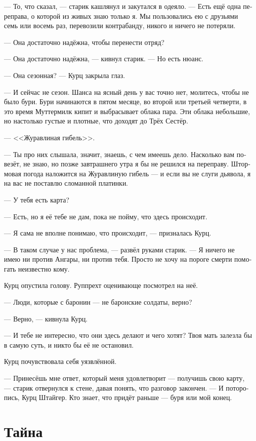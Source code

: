 \documentclass[a4paper,12pt,fleqn]{book}\usepackage{polyglossia}\setdefaultlanguage[babelshorthands=true]{russian}\setotherlanguage{english}\defaultfontfeatures{Ligatures=TeX,Mapping=tex-text}\usepackage{xcolor}\newcommand{\ml}[3]{#2}
\begin{document}
--- То, что сказал, --- старик кашлянул и закутался в одеяло.
--- Есть ещё одна переправа, о которой из живых знаю только я.
Мы пользовались ею с друзьями семь или восемь раз, перевозили контрабанду, никого и ничего не потеряли.

--- Она достаточно надёжна, чтобы перенести отряд?

--- Она достаточно надёжна, --- кивнул старик.
--- Но есть нюанс.

--- Она сезонная? --- Курц закрыла глаз.

--- И сейчас не сезон.
Шанса на ясный день у вас точно нет, молитесь, чтобы не было бури.
Бури начинаются в пятом месяце, во второй или третьей четверти, в это время Муттермилк кипит и выбрасывает облака пара.
Эти облака небольшие, но настолько густые и плотные, что доходят до Трёх Сестёр.

--- <<Журавлиная гибель>>.

--- Ты про них слышала, значит, знаешь, с чем имеешь дело.
Насколько вам повезёт, не знаю, но позже завтрашнего утра я бы не решился на переправу.
Штормовая погода наложится на Журавлиную гибель --- и если вы не слуги дьявола, я на вас не поставлю сломанной платинки.

--- У тебя есть карта?

--- Есть, но я её тебе не дам, пока не пойму, что здесь происходит.

--- Я сама не вполне понимаю, что происходит, --- призналась Курц.

--- В таком случае у нас проблема, --- развёл руками старик.
--- Я ничего не имею ни против Ангары, ни против тебя.
Просто не хочу на пороге смерти помогать неизвестно кому.

Курц опустила голову.
Руппрехт оценивающе посмотрел на неё.

--- Люди, которые с баронин --- не баронские солдаты, верно?

--- Верно, --- кивнула Курц.

--- И тебе не интересно, что они здесь делают и чего хотят?
Твоя мать залезла бы в самую суть, и никто бы её не остановил.

Курц почувствовала себя уязвлённой.

--- Принесёшь мне ответ, который меня удовлетворит --- получишь свою карту, --- старик отвернулся к стене, давая понять, что разговор закончен.
--- И поторопись, Курц Штайгер.
Кто знает, что придёт раньше --- буря или мой конец.

\section{Тайна}
\end{document}
